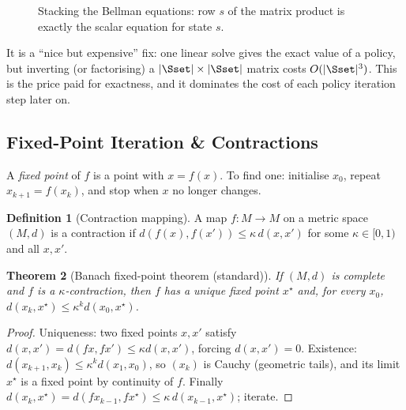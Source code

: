 \documentclass[11pt,a4paper]{article}
\theoremstyle{plain}
\newtheorem{theorem}{Theorem}[section]
\theoremstyle{definition}
\newtheorem{definition}[theorem]{Definition}
\theoremstyle{remark}
\begin{document}
\begin{figure}[h]
\centering
{}
\caption{Stacking the Bellman equations: row $s$ of the matrix product is exactly the scalar equation for state $s$.}
\end{figure}

\begin{intuition}
It is a ``nice but expensive'' fix: one linear solve gives the exact value of a policy, but inverting (or factorising) a $|\Sset|\times|\Sset|$ matrix costs $O(|\Sset|^3)$. This is the price paid for exactness, and it dominates the cost of each policy iteration step later on.
\end{intuition}

\subsection{Fixed-Point Iteration \& Contractions}
A \emph{fixed point} of $f$ is a point with $x=f(x)$. To find one: initialise $x_0$, repeat $x_{k+1}=f(x_k)$, and stop when $x$ no longer changes.

\begin{definition}[Contraction mapping]
A map $f:M\to M$ on a metric space $(M,d)$ is a contraction if $d(f(x),f(x'))\le \kappa\, d(x,x')$ for some $\kappa\in[0,1)$ and all $x,x'$.
\end{definition}

\begin{theorem}[Banach fixed-point theorem (standard)]\label{thm:banach}
If $(M,d)$ is complete and $f$ is a $\kappa$-contraction, then $f$ has a unique fixed point $x^\star$ and, for every $x_0$, $d(x_k,x^\star)\le\kappa^k d(x_0,x^\star)$.
\end{theorem}
\begin{proof}
Uniqueness: two fixed points $x,x'$ satisfy $d(x,x')=d(fx,fx')\le\kappa d(x,x')$, forcing $d(x,x')=0$. Existence: $d(x_{k+1},x_k)\le\kappa^k d(x_1,x_0)$, so $(x_k)$ is Cauchy (geometric tails), and its limit $x^\star$ is a fixed point by continuity of $f$. Finally $d(x_k,x^\star)=d(fx_{k-1},fx^\star)\le\kappa\,d(x_{k-1},x^\star)$; iterate.
\end{proof}
\end{document}
